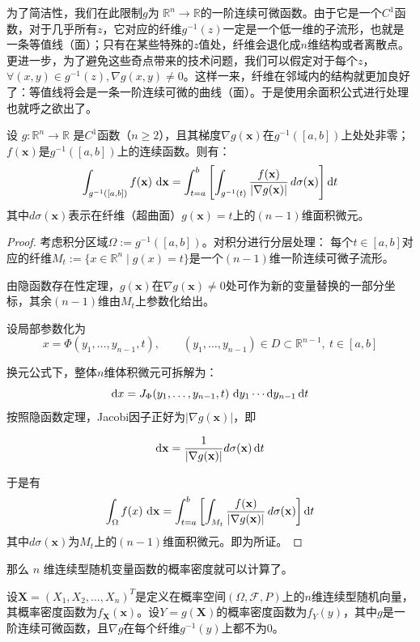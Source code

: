 为了简洁性，我们在此限制$g$为 $\mathbb{R}^n \rightarrow \mathbb{R}$的一阶连续可微函数。由于它是一个$C^1$函数，对于几乎所有$z$，它对应的纤维$g^{-1}(z)$一定是一个低一维的子流形，也就是一条等值线（面）；只有在某些特殊的$z$值处，纤维会退化成$n$维结构或者离散点。更进一步，为了避免这些奇点带来的技术问题，我们可以假定对于每个$z$，$\forall (x, y) \in g^{-1}(z), \nabla g(x, y) \neq 0$。这样一来，纤维在邻域内的结构就更加良好了：等值线将会是一条一阶连续可微的曲线（面）。于是使用余面积公式进行处理也就呼之欲出了。

\begin{theorem}[n维余面积公式]
设 $g: \mathbb{R}^n \to \mathbb{R}$ 是$C^1$函数（$n\geq 2$），且其梯度$\nabla g(\mathbf{x})$在$g^{-1}([a,b])$上处处非零；$f(\mathbf{x})$是$g^{-1}([a,b])$上的连续函数。则有：
\[
\int_{g^{-1}([a,b])} f(\mathbf{x})\,\mathop{}\!\mathrm{d}\mathbf{x}
=
\int_{t=a}^{b}
\left[
  \int_{g^{-1}(t)} \frac{f(\mathbf{x})}{|\nabla g(\mathbf{x})|}\,d\sigma(\mathbf{x})
\right]
\mathop{}\!\mathrm{d} t
\]
其中$d\sigma(\mathbf{x})$表示在纤维（超曲面）$g(\mathbf{x}) = t$上的$(n-1)$维面积微元。
\end{theorem}

\begin{proof}
考虑积分区域$\Omega := g^{-1}([a, b])$。对积分进行分层处理：
每个$t \in [a, b]$对应的纤维$M_t := \{x \in \mathbb{R}^n \mid g(x) = t\}$是一个$(n-1)$维一阶连续可微子流形。

由隐函数存在性定理，$g(\mathbf{x})$在$\nabla g(\mathbf{x})\ne 0$处可作为新的变量替换的一部分坐标，其余$(n-1)$维由$M_t$上参数化给出。

设局部参数化为
\[
x = \Phi(y_1, \ldots, y_{n-1}, t), \qquad (y_1, \ldots, y_{n-1}) \in D \subset \mathbb{R}^{n-1},\ t \in [a, b]
\]

换元公式下，整体$n$维体积微元可拆解为：
\[
\mathop{}\!\mathrm{d} x = J_\Phi(y_1,\ldots,y_{n-1}, t)\, \mathop{}\!\mathrm{d} y_1 \cdots \mathop{}\!\mathrm{d} y_{n-1} \mathop{}\!\mathrm{d} t
\]
按照隐函数定理，Jacobi因子正好为$|\nabla g(\mathbf{x})|$，即

\[
\mathop{}\!\mathrm{d}\mathbf{x} = \frac{1}{|\nabla g(\mathbf{x})|} d\sigma(\mathbf{x}) \mathop{}\!\mathrm{d} t
\]

于是有
\[
\int_{\Omega} f(x)\,\mathop{}\!\mathrm{d}\mathbf{x}
= \int_{t = a}^{b}
  \left[ \int_{M_t} \frac{f(\mathbf{x})}{|\nabla g(\mathbf{x})|}\, d\sigma(\mathbf{x}) \right] \mathop{}\!\mathrm{d} t
\]
其中$d\sigma(\mathbf{x})$为$M_t$上的$(n-1)$维面积微元。即为所证。
\end{proof}

那么 $n$ 维连续型随机变量函数的概率密度就可以计算了。

设$\mathbf{X} = (X_1, X_2, \ldots, X_n)^T$是定义在概率空间$(\Omega, \mathcal{F}, P)$上的$n$维连续型随机向量，其概率密度函数为$f_{\mathbf{X}}(\mathbf{x})$。设$Y = g(\mathbf{X})$的概率密度函数为$f_Y(y)$，其中$g$是一阶连续可微函数，且$\nabla g$在每个纤维$g^{-1}(y)$上都不为$0$。

